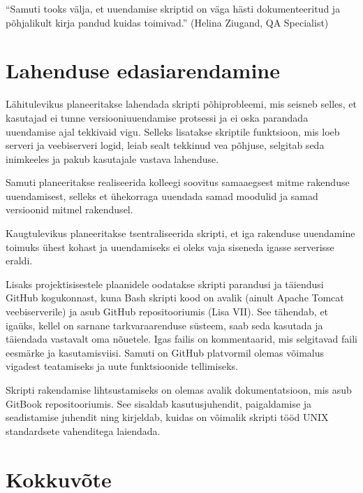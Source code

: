 \documentclass[12pt]{article}
\begin{document}
    \begin{displayquote}
    ``Samuti tooks välja, et uuendamise skriptid on väga hästi dokumenteeritud ja põhjalikult kirja pandud kuidas toimivad.'' (Helina Ziugand, QA Specialist)
    \end{displayquote}

  \newpage
  
  \section{Lahenduse edasiarendamine}
  
  Lähitulevikus planeeritakse lahendada skripti põhiprobleemi, mis seisneb selles, et kasutajad ei tunne versiooniuuendamise protsessi ja ei oska parandada uuendamise ajal tekkivaid vigu. Selleks lisatakse skriptile  funktsioon, mis loeb serveri ja veebiserveri logid, leiab sealt tekkinud vea põhjuse, selgitab seda inimkeeles ja pakub kasutajale vastava lahenduse.
  
  Samuti planeeritakse realiseerida kolleegi soovitus samaaegsest mitme rakenduse uuendamisest, selleks et ühekorraga uuendada samad moodulid ja samad versioonid mitmel rakendusel.
  
  Kaugtulevikus planeeritakse tsentraliseerida skripti, et iga rakenduse uuendamine toimuks ühest kohast ja uuendamiseks ei oleks vaja siseneda igasse serverisse eraldi.
  
  Lisaks projektisisestele plaanidele oodatakse skripti parandusi ja täiendusi GitHub kogukonnast, kuna Bash skripti kood on avalik (ainult Apache Tomcat veebiserverile) ja asub GitHub repositooriumis (Lisa VII). See tähendab, et igaüks, kellel on sarnane tarkvaraarenduse süsteem, saab seda kasutada ja täiendada vastavalt oma nõuetele. Igas failis on kommentaarid, mis selgitavad faili eesmärke ja kasutamisviisi. Samuti on GitHub platvormil olemas võimalus vigadest teatamiseks ja uute funktsioonide tellimiseks.
  
  Skripti rakendamise lihtsustamiseks on olemas avalik dokumentatsioon, mis asub GitBook repositooriumis. See sisaldab kasutusjuhendit, paigaldamise ja seadistamise juhendit ning kirjeldab, kuidas on võimalik skripti tööd UNIX standardsete vahenditega laiendada.
  
  \newpage
  
  \section*{Kokkuvõte}
  \label{kokkuvote}
  
\end{document}
